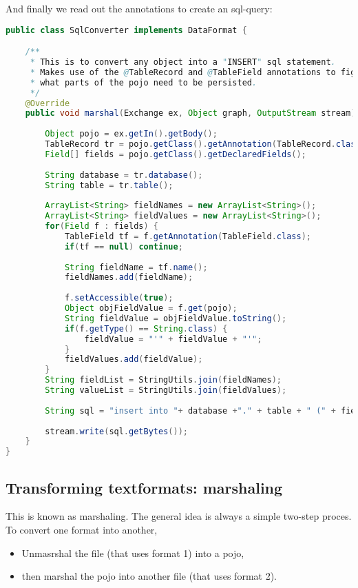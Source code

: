 And finally we read out the annotations to create an sql-query: 
\begin{lstlisting}[language=java]
public class SqlConverter implements DataFormat {

	/**
	 * This is to convert any object into a "INSERT" sql statement.
	 * Makes use of the @TableRecord and @TableField annotations to figure out 
	 * what parts of the pojo need to be persisted.
	 */
	@Override
	public void marshal(Exchange ex, Object graph, OutputStream stream) throws Exception {
		
		Object pojo = ex.getIn().getBody();
		TableRecord tr = pojo.getClass().getAnnotation(TableRecord.class);
		Field[] fields = pojo.getClass().getDeclaredFields();
		
		String database = tr.database();
		String table = tr.table();
		
		ArrayList<String> fieldNames = new ArrayList<String>();
		ArrayList<String> fieldValues = new ArrayList<String>();
		for(Field f : fields) {
			TableField tf = f.getAnnotation(TableField.class);
			if(tf == null) continue;
			
			String fieldName = tf.name();
			fieldNames.add(fieldName);
			
			f.setAccessible(true);
			Object objFieldValue = f.get(pojo);
			String fieldValue = objFieldValue.toString();
			if(f.getType() == String.class) {
				fieldValue = "'" + fieldValue + "'";
			}
			fieldValues.add(fieldValue);
		}
		String fieldList = StringUtils.join(fieldNames);
		String valueList = StringUtils.join(fieldValues);
		
		String sql = "insert into "+ database +"." + table + " (" + fieldList + ") values (" + valueList + ");";
		
		stream.write(sql.getBytes());
	}
}
\end{lstlisting}

\subsection{Transforming textformats: marshaling}

This is known as marshaling. The general idea is always a simple two-step proces. 
To convert one format into another, 
\begin{itemize}
    \item Unmasrshal the file (that uses format 1) into a pojo,
    \item then marshal the pojo into another file (that uses format 2). 
\end{itemize}


